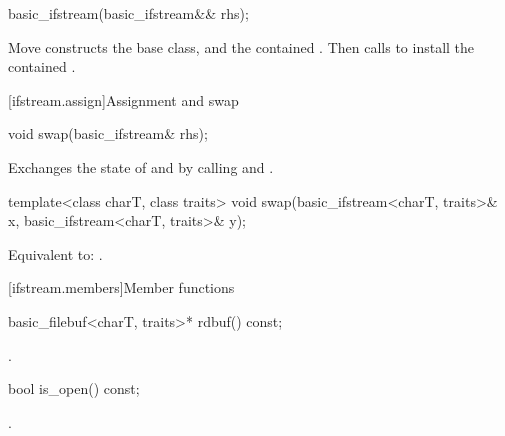 %
\begin{itemdecl}
basic_ifstream(basic_ifstream&& rhs);
\end{itemdecl}

\begin{itemdescr}
\pnum
\effects
Move constructs the base class, and the contained .
Then calls 
to install the contained .
\end{itemdescr}

[ifstream.assign]{Assignment and swap}

%
\begin{itemdecl}
void swap(basic_ifstream& rhs);
\end{itemdecl}

\begin{itemdescr}
\pnum
\effects
Exchanges the state of 
and  by calling
 and
.
\end{itemdescr}

%
\begin{itemdecl}
template<class charT, class traits>
  void swap(basic_ifstream<charT, traits>& x,
            basic_ifstream<charT, traits>& y);
\end{itemdecl}

\begin{itemdescr}
\pnum
\effects
Equivalent to: .
\end{itemdescr}

[ifstream.members]{Member functions}

%
\begin{itemdecl}
basic_filebuf<charT, traits>* rdbuf() const;
\end{itemdecl}

\begin{itemdescr}
\pnum
\returns
{}.
\end{itemdescr}

%
\begin{itemdecl}
bool is_open() const;
\end{itemdecl}

\begin{itemdescr}
\pnum
\returns
{}.
\end{itemdescr}

